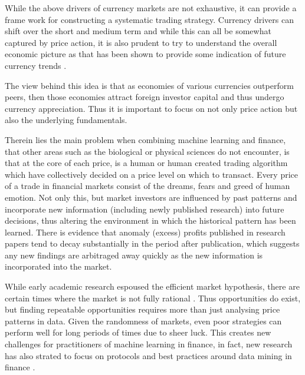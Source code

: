 \documentclass[12pt, a4paper]{article}
\begin{document}
While the above drivers of currency markets are not exhaustive, it can provide a frame work for constructing a systematic trading strategy. Currency drivers can shift over the short and medium term and while this can all be somewhat captured by price action, it is also prudent to try to understand the overall economic picture as that has been shown to provide some indication of future currency trends \cite{Rime2010}.\par The view behind this idea is that as economies of various currencies outperform peers, then those economies attract foreign investor capital and thus undergo currency appreciation. Thus it is important to focus on not only price action but also the underlying fundamentals.  \par
Therein lies the main problem when combining machine learning and finance, that other areas such as the biological or physical sciences do not encounter, is that at the core of each price, is a human or human created trading algorithm which have collectively decided on a price level on which to transact. \newline Every price of a trade in financial markets consist of the dreams, fears and greed of human emotion. Not only this, but market investors are influenced by past patterns and incorporate new information (including newly published research) into future decisions, thus altering the environment in which the historical pattern has been learned. There is evidence that anomaly (excess) profits published in research papers tend to decay substantially in the period after publication, which suggests any new findings are arbitraged away quickly as the new information is incorporated into the market\cite{Bartram2019}. 

While early academic research espoused the efficient market hypothesis, there are certain times where the market is not fully rational \cite{Dome2008}. Thus opportunities do exist, but finding repeatable opportunities requires more than just analysing price patterns in data. Given the randomness of markets, even poor strategies can perform well for long periods of times due to sheer luck. This creates new challenges for practitioners of machine learning in finance, in fact, new research has also strated to focus on protocols and best practices around data mining in finance \cite{Arnott2018}.
\end{document}
